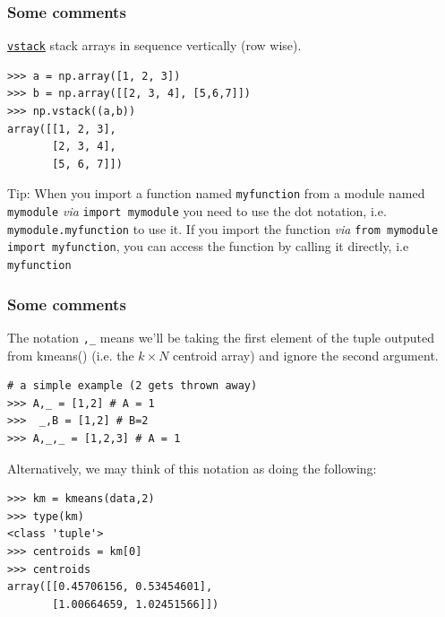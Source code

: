 \documentclass[xcolor=svgnames]{beamer}
\newcommand{\ft}[1]{\frametitle{#1}}
\begin{document}
\begin{frame}[fragile]\ft{Some comments}

\href{https://docs.scipy.org/doc/numpy/reference/generated/numpy.vstack.html}{\tt vstack} stack arrays in sequence vertically (row wise).
\begin{Verbatim}[frame=single]
>>> a = np.array([1, 2, 3])
>>> b = np.array([[2, 3, 4], [5,6,7]])
>>> np.vstack((a,b))
array([[1, 2, 3],
       [2, 3, 4],
       [5, 6, 7]])
\end{Verbatim}

\begin{block}{Tip:}
When you import a function named {\tt myfunction} from a module named {\tt mymodule} \textit{via} \verb|import mymodule| you need to use the dot notation, i.e. \verb|mymodule.myfunction| to use it.  If you import the function \textit{via} \verb|from mymodule import myfunction|, you can access the function by calling it directly, i.e \verb|myfunction| 
\end{block}


\end{frame}


\begin{frame}[fragile]\ft{Some comments}
The notation {\tt ,\_} means we'll be taking the first element of the tuple outputed from kmeans() (i.e. the $k\times N$ centroid array) and ignore the second argument.
\begin{Verbatim}[xleftmargin=0.2in, frame=single]
# a simple example (2 gets thrown away)
>>> A,_ = [1,2] # A = 1
>>>  _,B = [1,2] # B=2
>>> A,_,_ = [1,2,3] # A = 1
\end{Verbatim}

Alternatively, we may think of this notation as doing the following:
\begin{Verbatim}[xleftmargin=0.2in, frame=single]
>>> km = kmeans(data,2)
>>> type(km)
<class 'tuple'>
>>> centroids = km[0]
>>> centroids
array([[0.45706156, 0.53454601],
       [1.00664659, 1.02451566]])
\end{Verbatim}
\end{frame}
\end{document}
